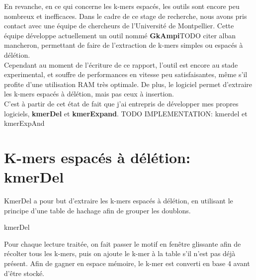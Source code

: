 \documentclass{report}
\begin{document}
      En revanche, en ce qui concerne les k-mers espacés, les outils sont encore peu nombreux et inefficaces.
      Dans le cadre de ce stage de recherche, nous avons pris contact avec une équipe de chercheurs de l'Université de Montpellier. Cette équipe développe actuellement un outil nommé \textbf{GkAmpi}TODO citer alban mancheron, permettant de faire de l'extraction de k-mers simples ou espacés à délétion.\\

      Cependant au moment de l'écriture de ce rapport, l'outil est encore au stade experimental, et souffre de performances en vitesse peu satisfaisantes, même s'il profite d'une utilisation RAM très optimale. De plus, le logiciel permet d'extraire les k-mers espacés à délétion, mais pas ceux à insertion.\\

      C'est à partir de cet état de fait que j'ai entrepris de développer mes propres logiciels, \textbf{kmerDel} et \textbf{kmerExpand}.
TODO IMPLEMENTATION: kmerdel et kmerExpAnd
  \chapter{K-mers espacés à délétion: kmerDel}
    KmerDel a pour but d'extraire les k-mers espacés à délétion, en utilisant le principe d'une table de hachage afin de grouper les doublons.\bigskip\\
    \normalsize
    \begin{algorithm}[H]{
      \caption{kmerDel}
    }\end{algorithm}\bigskip
    \large
    Pour chaque lecture traitée, on fait passer le motif en fenêtre glissante afin de récolter tous les k-mers, puis on ajoute le k-mer à la table s'il n'est pas déjà présent. Afin de gagner en espace mémoire, le k-mer est converti en base 4 avant d'être stocké.\\
\end{document}
